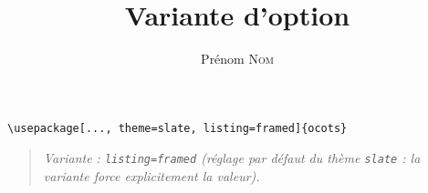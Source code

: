\documentclass[11pt]{ocots-book}
\title{Variante d'option}
\author{Prénom \textsc{Nom}}
\newcommand{\ocotsvariantnote}[1]{\begin{quote}\itshape Variante : #1\end{quote}}
\begin{document}
\maketitle

\begin{lstlisting}
\usepackage[..., theme=slate, listing=framed]{ocots}
\end{lstlisting}
\ocotsvariantnote{\texttt{listing=framed} (r\'eglage par d\'efaut du th\`eme \texttt{slate} : la variante force explicitement la valeur).}

\end{document}
